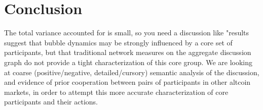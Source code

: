 \section{Conclusion}


The total variance accounted for is small, so you need a discussion like "results suggest that bubble dynamics may be strongly influenced by a core set of participants, but that traditional network measures on the aggregate discussion graph do not provide a tight characterization of this core group.  We are looking at coarse (positive/negative, detailed/cursory) semantic analysis of the discussion, and evidence of prior cooperation between pairs of participants in other altcoin markets, in order to attempt this more accurate characterization of core participants and their actions.
